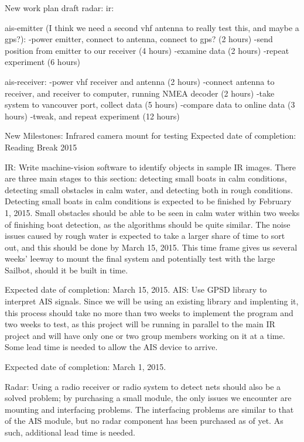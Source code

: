 New work plan draft
radar:
ir:


ais-emitter (I think we need a second vhf antenna to really test this, and maybe a gps?):
-power emitter, connect to antenna, connect to gps? (2 hours)
-send position from emitter to our receiver (4 hours)
-examine data (2 hours)
-repeat experiment (6 hours)

ais-receiver:
-power vhf receiver and antenna (2 hours)
-connect antenna to receiver, and receiver to computer, running NMEA decoder (2 hours)
-take system to vancouver port, collect data (5 hours)
-compare data to online data (3 hours)
-tweak, and repeat experiment (12 hours)


New Milestones:
Infrared camera mount for testing
Expected date of completion: Reading Break 2015

IR:
Write machine-vision software to identify objects in sample IR images. There are three main stages to this section: detecting small boats in calm conditions, detecting small obstacles in calm water, and detecting both in rough conditions. Detecting small boats in calm conditions is expected to be finished by February 1, 2015. Small obstacles should be able to be seen in calm water within two weeks of finishing boat detection, as the algorithms should be quite similar. The noise issues caused by rough water is expected to take a larger share of time to sort out, and this should be done by March 15, 2015. This time frame gives us several weeks' leeway to mount the final system and potentially test with the large Sailbot, should it be built in time.

Expected date of completion: March 15, 2015. \newline\newline
AIS:
Use GPSD library to interpret AIS signals. Since we will be using an existing library and implenting it, this process should take no more than two weeks to implement the program and two weeks to test, as this project will be running in parallel to the main IR project and will have only one or two group members working on it at a time. Some lead time is needed to allow the AIS device to arrive.

Expected date of completion: March 1, 2015.\newline


Radar:
Using a radio receiver or radio system to detect nets should also be a solved problem; by purchasing a small module, the only issues we encounter are mounting and interfacing problems. The interfacing problems are similar to that of the AIS module, but no radar component has been purchased as of yet. As such, additional lead time is needed.


